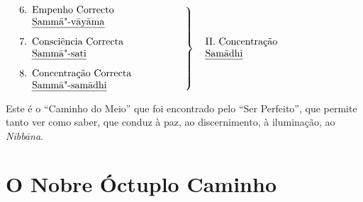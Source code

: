 \bigskip

$\left.
\begin{minipage}{0.52\linewidth}
\raggedright
\begin{enumerate}
\setcounter{enumi}{5}
  \item Empenho Correcto\newline
        \emph{Sammā"-vāyāma}

  \item Consciência Correcta\newline
        \emph{Sammā"-sati}

  \item Concentração Correcta\newline
        \emph{Sammā"-samādhi}
\end{enumerate}
\end{minipage}
\right\}
\hspace*{10pt}\parbox{0.4\linewidth}{II. Concentração\\ \emph{Samādhi}}
$

\vspace*{\baselineskip}

Este é o “Caminho do Meio” que foi encontrado pelo “Ser Perfeito”, que permite tanto ver como saber, que conduz à paz, ao discernimento, à iluminação, ao \emph{Nibbāna}.


\clearpage

\section{O Nobre Óctuplo Caminho}


